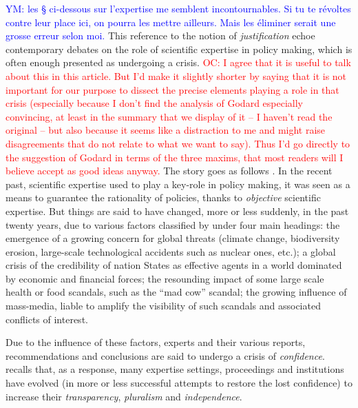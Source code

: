 \documentclass[preprint, french, english, 11pt, authoryear]{elsarticle}%
\newcommand{\commentYM}[1]{\textcolor{blue}{YM: #1}}
\newcommand{\commentOC}[1]{\textcolor{red}{OC: #1}}
\begin{document}
\commentYM{les § ci-dessous sur l'expertise me semblent incontournables. Si tu te révoltes contre leur place ici, on pourra les mettre ailleurs. Mais les éliminer serait une grosse erreur selon moi.}
This reference to the notion of \emph{justification} echoe contemporary debates on the role of scientific expertise in policy making, which is often enough presented as undergoing a crisis. 
\commentOC{I agree that it is useful to talk about this in this article. But I’d make it slightly shorter by saying that it is not important for our purpose to dissect the precise elements playing a role in that crisis (especially because I don’t find the analysis of Godard especially convincing, at least in the summary that we display of it – I haven’t read the original – but also because it seems like a distraction to me and might raise disagreements that do not relate to what we want to say). Thus I’d go directly to the suggestion of Godard in terms of the three maxims, that most readers will I believe accept as good ideas anyway.} 
The story goes as follows \citep{godard_environnement_2015}. In the recent past, scientific expertise used to play a key-role in policy making, it was seen as a means to guarantee the rationality of policies, thanks to \emph{objective} scientific expertise. But things are said to have changed, more or less suddenly, in the past twenty years, due to various factors classified by \citet{godard_environnement_2015} under four main headings: the emergence of a growing concern for global threats (climate change, biodiversity erosion, large-scale technological accidents such as nuclear ones, etc.); a global crisis of the credibility of nation States as effective agents in a world dominated by economic and financial forces; the resounding impact of some large scale health or food scandals, such as the “mad cow” scandal; the growing influence of mass-media, liable to amplify the visibility of such scandals and associated conflicts of interest.

Due to the influence of these factors, experts and their various reports, recommendations and conclusions are said to undergo a crisis of \emph{confidence}. \citet{godard_environnement_2015} recalls that, as a response, many expertise settings, proceedings and institutions have evolved (in more or less successful attempts to restore the lost confidence) to increase their \emph{transparency}, \emph{pluralism} and \emph{independence}.
\end{document}
